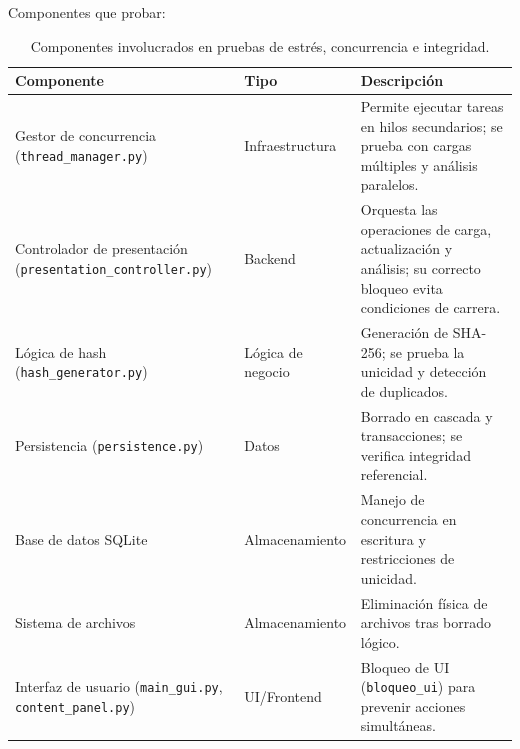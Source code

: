 \documentclass[11pt]{article}
\begin{document}
\clearpage
Componentes que probar:

\begin{table}[H]
    \centering
    \begin{tabular}{|L{0.34\textwidth}|L{0.18\textwidth}|L{0.38\textwidth}|}
        \hline
        \textbf{Componente} & \textbf{Tipo} & \textbf{Descripción} \\ \hline
        Gestor de concurrencia (\texttt{thread\_manager.py}) & Infraestructura & Permite ejecutar tareas en hilos secundarios; se prueba con cargas múltiples y análisis paralelos. \\ \hline
        Controlador de presentación (\texttt{presentation\_controller.py}) & Backend & Orquesta las operaciones de carga, actualización y análisis; su correcto bloqueo evita condiciones de carrera. \\ \hline
        Lógica de hash (\texttt{hash\_generator.py}) & Lógica de negocio & Generación de SHA-256; se prueba la unicidad y detección de duplicados. \\ \hline
        Persistencia (\texttt{persistence.py}) & Datos & Borrado en cascada y transacciones; se verifica integridad referencial. \\ \hline
        Base de datos SQLite & Almacenamiento & Manejo de concurrencia en escritura y restricciones de unicidad. \\ \hline
        Sistema de archivos & Almacenamiento & Eliminación física de archivos tras borrado lógico. \\ \hline
        Interfaz de usuario (\texttt{main\_gui.py}, \texttt{content\_panel.py}) & UI/Frontend & Bloqueo de UI (\texttt{bloqueo\_ui}) para prevenir acciones simultáneas. \\ \hline
    \end{tabular}
    \caption{Componentes involucrados en pruebas de estrés, concurrencia e integridad.}
    \label{tab:componentes-estres}
\end{table}
\end{document}
